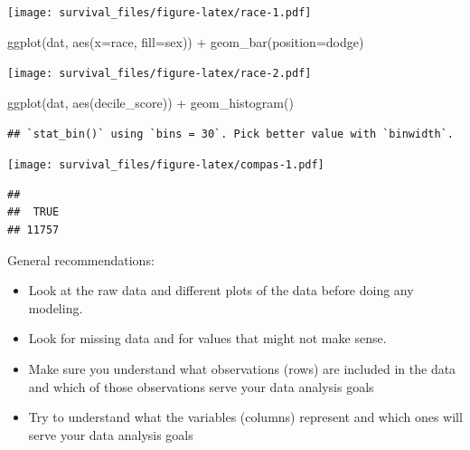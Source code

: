 \documentclass[
]{article}
\newenvironment{Shaded}{\begin{snugshade}}{\end{snugshade}}
\newcommand{\AttributeTok}[1]{\textcolor[rgb]{0.77,0.63,0.00}{#1}}
\newcommand{\FunctionTok}[1]{\textcolor[rgb]{0.00,0.00,0.00}{#1}}
\newcommand{\NormalTok}[1]{#1}
\newcommand{\SpecialCharTok}[1]{\textcolor[rgb]{0.00,0.00,0.00}{#1}}
\newcommand{\StringTok}[1]{\textcolor[rgb]{0.31,0.60,0.02}{#1}}
\begin{document}
\texttt{[image: survival\_files/figure-latex/race-1.pdf]}

\begin{Shaded}
\begin{Highlighting}[]
\FunctionTok{ggplot}\NormalTok{(dat, }\FunctionTok{aes}\NormalTok{(}\AttributeTok{x=}\NormalTok{race, }\AttributeTok{fill=}\NormalTok{sex)) }\SpecialCharTok{+}
  \FunctionTok{geom\_bar}\NormalTok{(}\AttributeTok{position=}\StringTok{\textquotesingle{}dodge\textquotesingle{}}\NormalTok{)}
\end{Highlighting}
\end{Shaded}

\texttt{[image: survival\_files/figure-latex/race-2.pdf]}

\begin{Shaded}
\begin{Highlighting}[]
\FunctionTok{ggplot}\NormalTok{(dat, }\FunctionTok{aes}\NormalTok{(decile\_score)) }\SpecialCharTok{+}
  \FunctionTok{geom\_histogram}\NormalTok{()}
\end{Highlighting}
\end{Shaded}

\begin{verbatim}
## `stat_bin()` using `bins = 30`. Pick better value with `binwidth`.
\end{verbatim}

\texttt{[image: survival\_files/figure-latex/compas-1.pdf]}

\begin{Shaded}
\end{Shaded}

\begin{verbatim}
## 
##  TRUE 
## 11757
\end{verbatim}

General recommendations:

\begin{itemize}
\item
  Look at the raw data and different plots of the data before doing any
  modeling.
\item
  Look for missing data and for values that might not make sense.
\item
  Make sure you understand what observations (rows) are included in the
  data and which of those observations serve your data analysis goals
\item
  Try to understand what the variables (columns) represent and which
  ones will serve your data analysis goals
\end{itemize}
\end{document}
